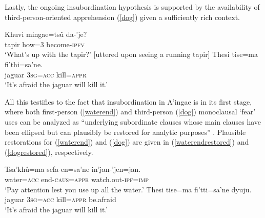 \documentclass[output=paper,colorlinks,citecolor=brown]{langscibook}
\begin{document}
Lastly, the ongoing insubordination hypothesis is supported by the availability of third-person-oriented apprehension (\ref{dog}) given a sufficiently rich context.
\begin{exe} 
    \ex \label{dog} \begin{xlist}
     \gll Khuvi mingae=tsû da-'je?   \\
             tapir how\textsc{=}3 become-\textsc{ipfv}  \\
        \glt `What's up with the tapir?' [uttered upon seeing a running tapir]
     \gll {\ob}Thesi tise=ma fi'thi=sa'ne.{\cb}   \\
             jaguar \textsc{3sg=acc} kill=\textsc{appr}   \\
        \glt `It's afraid the jaguar will kill it.' 
    \end{xlist}
\end{exe}

All this testifies to the fact that insubordination in A'ingae is in its first stage, where both first-person (\ref{waterend}) and third-person (\ref{dog}) monoclausal `fear' uses can be analyzed as ``underlying subordinate clauses whose main clauses have been ellipsed but can plausibly be restored for analytic purposes'' \citep[430]{evans2007insubordination}. Plausible restorations for (\ref{waterend}) and (\ref{dog}) are given in (\ref{waterendrestored}) and (\ref{dogrestored}), respectively.
\begin{exe}
    \ex \label{waterendrestored}
    \gll {\ob}Tsa'khû=ma {sefa-en=sa'ne{\cb}} in'jan-'jen=jan. \\
    water=\textsc{acc} {end-\textsc{caus=appr}} {watch.out-\textsc{ipf=imp}} \\
    \glt `Pay attention lest you use up all the water.'
    \ex \label{dogrestored}
    \gll {\ob}Thesi tise=ma {fi'tti=sa'ne{\cb}} dyuju.  \\
        jaguar \textsc{3sg=acc} kill=\textsc{appr} {be.afraid}  \\
    \glt `It's afraid the jaguar will kill it.' 
\end{exe}
    
\end{document}
